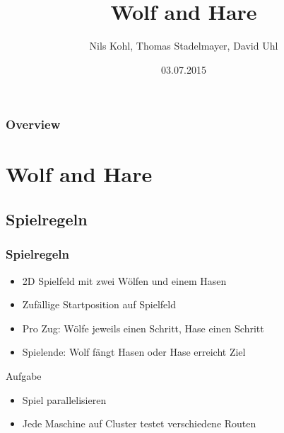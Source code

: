 \documentclass{beamer}
\title[Short title]{Wolf and Hare} %
\author{Nils Kohl, Thomas Stadelmayer, David Uhl} %
\institute[FAU] %
{
Friedrich-Alexander Universit\"at Erlangen-N\"urnberg \\ %
\medskip
}
\date{03.07.2015} %
\begin{document}
\begin{frame}
\titlepage %
\end{frame}

\begin{frame}
\frametitle{Overview} %
\tableofcontents %
\end{frame}


\section{Wolf and Hare}
\subsection{Spielregeln}
\begin{frame}
\frametitle{Spielregeln}
\begin{itemize}
\item 2D Spielfeld mit zwei W\"olfen und einem Hasen
\item Zuf\"allige Startposition auf Spielfeld
\item Pro Zug: W\"olfe jeweils einen Schritt, Hase einen Schritt
\item Spielende: Wolf f\"angt Hasen oder Hase erreicht Ziel
\end{itemize}
\begin{block}{Aufgabe}
\begin{itemize}

\item Spiel parallelisieren
\item Jede Maschine auf Cluster testet verschiedene Routen
\end{itemize}

\end{block}
\end{frame}
 
\end{document}
